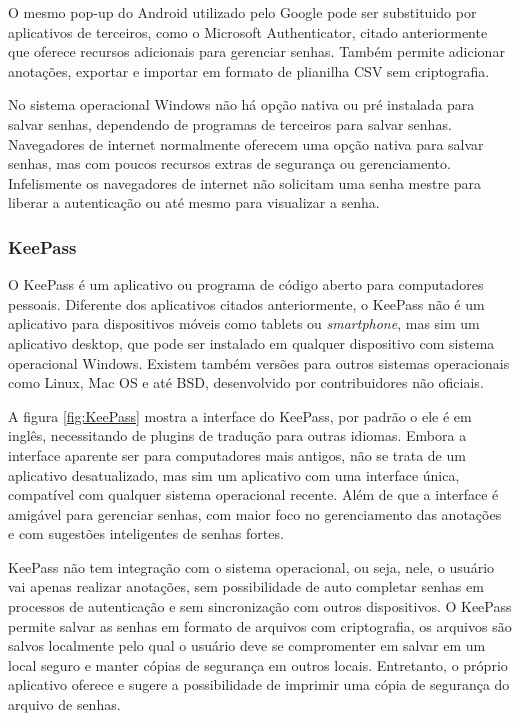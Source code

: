 \documentclass[12pt]{article}
\begin{document}
O mesmo pop-up do Android utilizado pelo Google pode ser substituido por
aplicativos de terceiros, como o Microsoft Authenticator, citado anteriormente
que oferece recursos adicionais para gerenciar senhas.
Também permite adicionar anotações, exportar e importar em formato de plianilha
CSV sem criptografia.

No sistema operacional Windows não há opção nativa ou pré instalada para
salvar senhas, dependendo de programas de terceiros para salvar senhas.
Navegadores de internet normalmente oferecem uma opção nativa para salvar senhas,
mas com poucos recursos extras de segurança ou gerenciamento.
Infelismente os navegadores de internet não solicitam uma senha mestre para liberar
a autenticação ou até mesmo para visualizar a senha.

\subsubsection{KeePass}

O KeePass é um aplicativo ou programa de código aberto para computadores pessoais.
Diferente dos aplicativos citados anteriormente, o KeePass não é um aplicativo
para dispositivos móveis como tablets ou \textit{smartphone}, mas sim um aplicativo desktop,
que pode ser instalado em qualquer dispositivo com sistema operacional Windows.
Existem também versões para outros sistemas operacionais como Linux, Mac OS e até
BSD, desenvolvido por contribuidores não oficiais.

A figura \ref{fig:KeePass} mostra a interface do KeePass, por padrão o ele é em inglês,
necessitando de plugins de tradução para outras idiomas.
Embora a interface aparente ser para computadores mais antigos, não se trata de um
aplicativo desatualizado, mas sim um aplicativo com uma interface única, compatível
com qualquer sistema operacional recente.
Além de que a interface é amigável para gerenciar senhas, com maior foco no gerenciamento
das anotações e com sugestões inteligentes de senhas fortes.

KeePass não tem integração com o sistema operacional, ou seja, nele, o usuário vai apenas
realizar anotações, sem possibilidade de auto completar senhas em processos de autenticação
e sem sincronização com outros dispositivos.
O KeePass permite salvar as senhas em formato de arquivos com criptografia, os arquivos
são salvos localmente pelo qual o usuário deve se compromenter em salvar em um local
seguro e manter cópias de segurança em outros locais.
Entretanto, o próprio aplicativo oferece e sugere a possibilidade de imprimir uma cópia
de segurança do arquivo de senhas.
\end{document}

